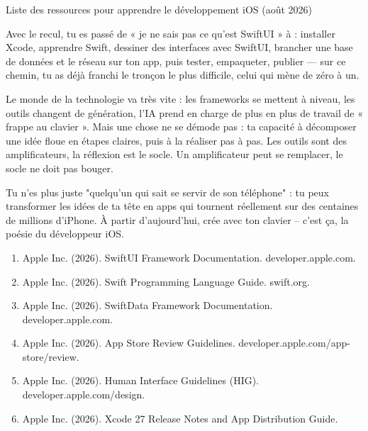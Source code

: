 \begin{center}\small\color{gray}Liste des ressources pour apprendre le développement iOS (août 2026)\end{center}


Avec le recul, tu es passé de « je ne sais pas ce qu'est SwiftUI » à : installer Xcode, apprendre Swift, dessiner des interfaces avec SwiftUI, brancher une base de données et le réseau sur ton app, puis tester, empaqueter, publier — sur ce chemin, tu as déjà franchi le tronçon le plus difficile, celui qui mène de zéro à un.

Le monde de la technologie va très vite : les frameworks se mettent à niveau, les outils changent de génération, l'IA prend en charge de plus en plus de travail de « frappe au clavier ». Mais une chose ne se démode pas : ta capacité à décomposer une idée floue en étapes claires, puis à la réaliser pas à pas. Les outils sont des amplificateurs, la réflexion est le socle. Un amplificateur peut se remplacer, le socle ne doit pas bouger.

Tu n'es plus juste "quelqu'un qui sait se servir de son téléphone" : tu peux transformer les idées de ta tête en apps qui tournent réellement sur des centaines de millions d'iPhone. À partir d'aujourd'hui, crée avec ton clavier – c'est ça, la poésie du développeur iOS.


\begin{enumerate}
  \item Apple Inc. (2026). SwiftUI Framework Documentation. developer.apple.com.
  \item Apple Inc. (2026). Swift Programming Language Guide. swift.org.
  \item Apple Inc. (2026). SwiftData Framework Documentation. developer.apple.com.
  \item Apple Inc. (2026). App Store Review Guidelines. developer.apple.com/app-store/review.
  \item Apple Inc. (2026). Human Interface Guidelines (HIG). developer.apple.com/design.
  \item Apple Inc. (2026). Xcode 27 Release Notes and App Distribution Guide.
\end{enumerate}
